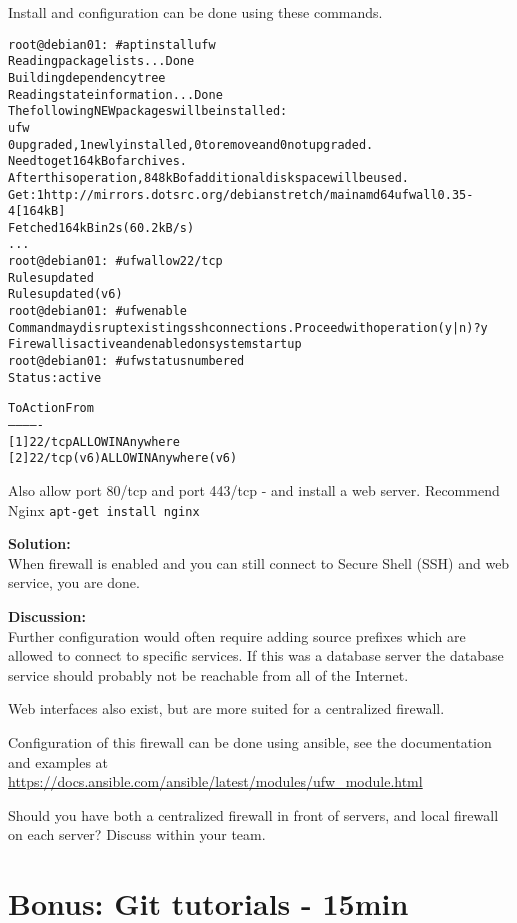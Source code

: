 \documentclass[a4paper,11pt,notitlepage]{report}
\begin{document}
Install and configuration can be done using these commands.
\begin{alltt}
root@debian01:~# apt install ufw
Reading package lists... Done
Building dependency tree
Reading state information... Done
The following NEW packages will be installed:
  ufw
0 upgraded, 1 newly installed, 0 to remove and 0 not upgraded.
Need to get 164 kB of archives.
After this operation, 848 kB of additional disk space will be used.
Get:1 http://mirrors.dotsrc.org/debian stretch/main amd64 ufw all 0.35-4 [164 kB]
Fetched 164 kB in 2s (60.2 kB/s)
...
root@debian01:~# ufw allow 22/tcp
Rules updated
Rules updated (v6)
root@debian01:~# ufw enable
Command may disrupt existing ssh connections. Proceed with operation (y|n)? y
Firewall is active and enabled on system startup
root@debian01:~# ufw status numbered
Status: active

     To                         Action      From
     --                         ------      ----
[ 1] 22/tcp                     ALLOW IN    Anywhere
[ 2] 22/tcp (v6)                ALLOW IN    Anywhere (v6)
\end{alltt}

Also allow port 80/tcp and port 443/tcp - and install a web server. Recommend Nginx \verb+apt-get install nginx+

{\bf Solution:}\\
When firewall is enabled and you can still connect to Secure Shell (SSH) and web service, you are done.

{\bf Discussion:}\\
Further configuration would often require adding source prefixes which are allowed to connect to specific services. If this was a database server the database service should probably not be reachable from all of the Internet.

Web interfaces also exist, but are more suited for a centralized firewall.

Configuration of this firewall can be done using ansible, see the documentation and examples at \url{https://docs.ansible.com/ansible/latest/modules/ufw_module.html}

Should you have both a centralized firewall in front of servers, and local firewall on each server? Discuss within your team.



\chapter{Bonus: Git tutorials - 15min}
\label{ex:git-tutorial}
\end{document}
